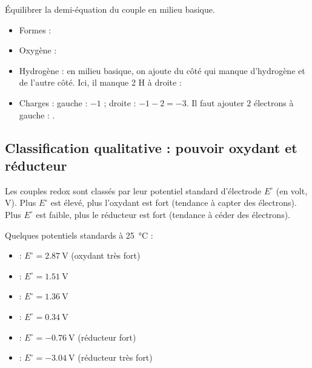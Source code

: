 \begin{exemple}
Équilibrer la demi-équation du couple  en milieu basique.
\begin{itemize}
    \item Formes : 
    \item Oxygène : 
    \item Hydrogène : en milieu basique, on ajoute  du côté qui manque d'hydrogène et  de l'autre côté. Ici, il manque 2 H à droite : 
    \item Charges : gauche : $-1$ ; droite : $-1 -2 = -3$. Il faut ajouter $2$ électrons à gauche : .
\end{itemize}
\end{exemple}

\subsection{Classification qualitative : pouvoir oxydant et réducteur}

\begin{propriete}
Les couples redox sont classés par leur potentiel standard d'électrode $E^\circ$ (en volt, \si{\volt}). Plus $E^\circ$ est élevé, plus l'oxydant est fort (tendance à capter des électrons). Plus $E^\circ$ est faible, plus le réducteur est fort (tendance à céder des électrons).
\end{propriete}

\begin{exemple}
Quelques potentiels standards à \SI{25}{\celsius} :
\begin{itemize}
    \item {} : $E^\circ = \SI{2.87}{\volt}$ (oxydant très fort)
    \item {} : $E^\circ = \SI{1.51}{\volt}$
    \item {} : $E^\circ = \SI{1.36}{\volt}$
    \item {} : $E^\circ = \SI{0.34}{\volt}$
    \item {} : $E^\circ = \SI{-0.76}{\volt}$ (réducteur fort)
    \item {} : $E^\circ = \SI{-3.04}{\volt}$ (réducteur très fort)
\end{itemize}
\end{exemple}

